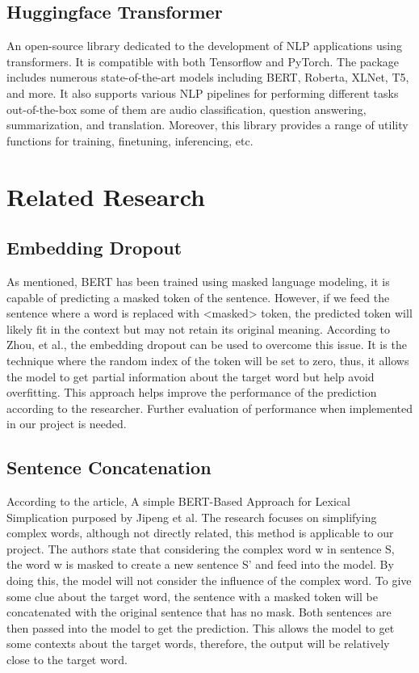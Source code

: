 \documentclass[12pt,oneside,openright,a4paper]{cpe-english-project}
\begin{document}
\subsection{Huggingface Transformer} 
An open-source library dedicated to the development of NLP applications using transformers. It is compatible with both Tensorflow and PyTorch. The package includes numerous state-of-the-art models including BERT, Roberta, XLNet, T5, and more. It also supports various NLP pipelines for performing different tasks out-of-the-box some of them are audio classification, question answering, summarization, and translation. Moreover, this library provides a range of utility functions for training, finetuning, inferencing, etc.


\section{Related Research}
\subsection{Embedding Dropout}
As mentioned, BERT has been trained using masked language modeling, it is capable of predicting a masked token of the sentence. However, if we feed the sentence where a word is replaced with <masked> token, the predicted token will likely fit in the context but may not retain its original meaning. According to Zhou, et al., the embedding dropout can be used to overcome this issue. It is the technique where the random index of the token will be set to zero, thus, it allows the model to get partial information about the target word but help avoid overfitting. This approach helps improve the performance of the prediction according to the researcher. Further evaluation of performance when implemented in our project is needed.

\subsection{Sentence Concatenation}
According to the article, A simple BERT-Based Approach for Lexical Simplication purposed by Jipeng et al. The research focuses on simplifying complex words, although not directly related, this method is applicable to our project. The authors state that considering the complex word w in sentence S, the word w is masked to create a new sentence S’ and feed into the model. By doing this, the model will not consider the influence of the complex word.  To give some clue about the target word, the sentence with a masked token will be concatenated with the original sentence that has no mask. Both sentences are then passed into the model to get the prediction. This allows the model to get some contexts about the target words, therefore, the output will be relatively close to the target word. 
\end{document}
